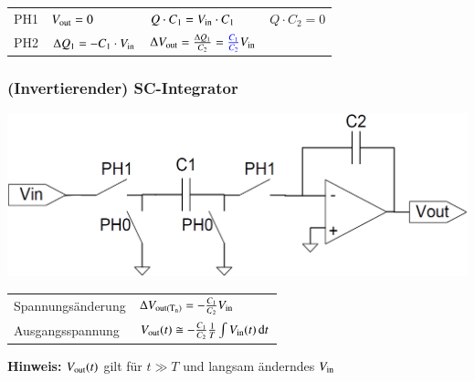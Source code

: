 \begin{tabular}{@{}l l l l@{}} 
    PH1   & $V_{\rm out} = 0$                    & $Q \cdot C_1 = V_{\rm in} \cdot C_1$  & $ Q \cdot C_2 = 0$ \\
    PH2   & $\Delta Q_1 = -C_1 \cdot V_{\rm in}$ & $\Delta V_{\rm out} = \frac{\Delta Q_1}{C_2} = {\color{blue} \frac{C_1}{C_2} } V_{\rm in}$ \\
\end{tabular}


\subsubsection{(Invertierender) SC-Integrator}

\begin{minipage}[c]{0.4\columnwidth}
    \includegraphics[width=\columnwidth]{images/sc_integrator.png}
\end{minipage}
\hfill
\begin{minipage}[c]{0.58\columnwidth}
    \begin{tabular}{@{}ll@{}}
        Spannungsänderung   & $\Delta V_{\rm out(T_n)} = - \frac{C_1}{C_2} V_{\rm in}$ \\
        Ausgangsspannung    & $V_{\rm out}(t) \cong - \frac{C_1}{C_2} \frac{1}{T} \int V_{\rm in}(t) \mathop{} \! \mathrm{d} t$ \\
    \end{tabular}

    \textbf{Hinweis:} $V_{\rm out}(t)$ gilt für $t \gg T$ und langsam änderndes $V_{\rm in}$
\end{minipage}

